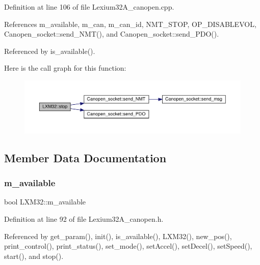 Definition at line 106 of file Lexium32\+A\+\_\+canopen.\+cpp.



References m\+\_\+available, m\+\_\+can, m\+\_\+can\+\_\+id, N\+M\+T\+\_\+\+S\+T\+OP, O\+P\+\_\+\+D\+I\+S\+A\+B\+L\+E\+V\+OL, Canopen\+\_\+socket\+::send\+\_\+\+N\+M\+T(), and Canopen\+\_\+socket\+::send\+\_\+\+P\+D\+O().



Referenced by is\+\_\+available().

Here is the call graph for this function\+:\nopagebreak
\begin{figure}[H]
\begin{center}
\leavevmode
\includegraphics[width=350pt]{class_l_x_m32_a73364111a5c2be2d60b7456704f7b9a8_cgraph}
\end{center}
\end{figure}


\subsection{Member Data Documentation}
\mbox{\label{class_l_x_m32_a474f3670b392536b81dcfc202212bcb8}} 
\subsubsection{\texorpdfstring{m\+\_\+available}{m\_available}}
{\footnotesize\ttfamily bool L\+X\+M32\+::m\+\_\+available\hspace{0.3cm}{\ttfamily [private]}}



Definition at line 92 of file Lexium32\+A\+\_\+canopen.\+h.



Referenced by get\+\_\+param(), init(), is\+\_\+available(), L\+X\+M32(), new\+\_\+pos(), print\+\_\+control(), print\+\_\+status(), set\+\_\+mode(), set\+Accel(), set\+Decel(), set\+Speed(), start(), and stop().

\mbox{\label{class_l_x_m32_a345b56ded3041759e3741b75a1391211}} 
